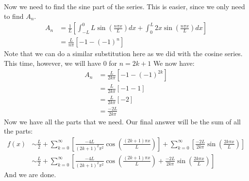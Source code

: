 \documentclass{article}
\begin{document}
\noindent Now we need to find the sine part of the series. This is easier,
since we only need to find $A_{n}$.
\begin{align*}
A_{n} &= \frac{1}{L}\left[\int_{-L}^{0}L\sin{\left(\frac{n\pi x}{L}\right)}dx +
\int_{0}^{L}2x\sin{\left(\frac{n\pi x}{L}\right)}dx \right]\\
&= \frac{L}{n\pi}\left[-1-(-1)^{n}\right]
\end{align*}
\noindent Note that we can do a similar substitution here as we did with the
cosine series. This time, however, we will have $0$ for $n = 2k+1$ We now have:
\begin{align*}
A_{n} &= \frac{L}{2k\pi}\left[-1-(-1)^{2k}\right]\\
&= \frac{L}{2k\pi}\left[-1 - 1\right]\\
&= \frac{L}{2k\pi}\left[-2\right]\\
&= \frac{-2L}{2k\pi}
\end{align*}
\noindent Now we have all the parts that we need. Our final answer will be
the sum of all the parts:
\begin{align*}
f(x)&\sim \frac{L}{2} + \sum_{k = 0}^{\infty}\left[\frac{-4L}{(2k+1)^{2}\pi^{2}}
\cos{\left(\frac{(2k + 1)\pi x}{L}\right)} \right] + \sum_{k =
0}^{\infty}\left[\frac{-2L}{2k\pi}\sin{\left(\frac{2k\pi x}{L}\right)} \right]\\
&\sim \frac{L}{2} + \sum_{k = 0}^{\infty}\left[\frac{-4L}{(2k+1)^{2}\pi^{2}}
\cos{\left(\frac{(2k + 1)\pi x}{L}\right)} + \frac{-2L}{2k\pi}\sin{
\left(\frac{2k\pi x}{L}\right)} \right]
\end{align*}
\noindent And we are done.\\
\end{document}
